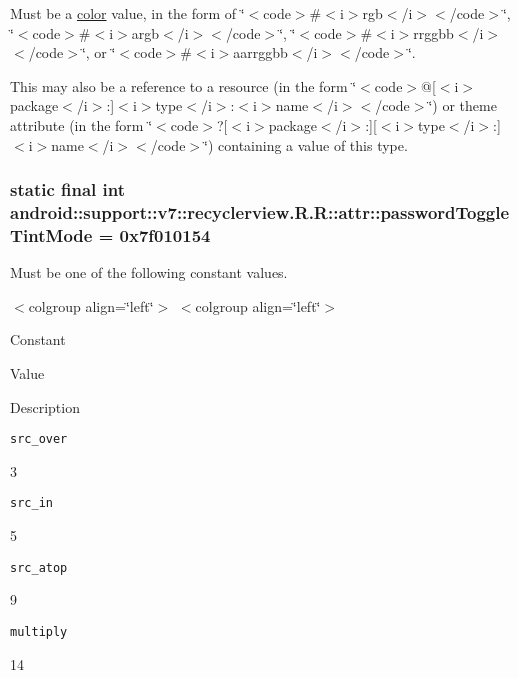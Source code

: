 Must be a \hyperlink{classandroid_1_1support_1_1v7_1_1recyclerview_1_1_r_1_1color}{color} value, in the form of \char`\"{}$<$code$>$\#$<$i$>$rgb$<$/i$>$$<$/code$>$\char`\"{}, \char`\"{}$<$code$>$\#$<$i$>$argb$<$/i$>$$<$/code$>$\char`\"{}, \char`\"{}$<$code$>$\#$<$i$>$rrggbb$<$/i$>$$<$/code$>$\char`\"{}, or \char`\"{}$<$code$>$\#$<$i$>$aarrggbb$<$/i$>$$<$/code$>$\char`\"{}. 

This may also be a reference to a resource (in the form \char`\"{}$<$code$>$@\mbox{[}$<$i$>$package$<$/i$>$:\mbox{]}$<$i$>$type$<$/i$>$:$<$i$>$name$<$/i$>$$<$/code$>$\char`\"{}) or theme attribute (in the form \char`\"{}$<$code$>$?\mbox{[}$<$i$>$package$<$/i$>$:\mbox{]}\mbox{[}$<$i$>$type$<$/i$>$:\mbox{]}$<$i$>$name$<$/i$>$$<$/code$>$\char`\"{}) containing a value of this type. \hypertarget{classandroid_1_1support_1_1v7_1_1recyclerview_1_1_r_1_1attr_da5187e8e09ef20343c6616fa4b2eb02}{
\subsubsection[{passwordToggleTintMode}]{\setlength{\rightskip}{0pt plus 5cm}static final int android::support::v7::recyclerview.R.R::attr::passwordToggleTintMode = 0x7f010154}}
\label{classandroid_1_1support_1_1v7_1_1recyclerview_1_1_r_1_1attr_da5187e8e09ef20343c6616fa4b2eb02}


Must be one of the following constant values. \begin{TabularC}{0}
\hline
\end{TabularC}
$<$colgroup align=\char`\"{}left\char`\"{}$>$ $<$colgroup align=\char`\"{}left\char`\"{}$>$ 

Constant

Value

Description 

{\tt src\_\-over}

3

{\tt src\_\-in}

5

{\tt src\_\-atop}

9

{\tt multiply}

14

